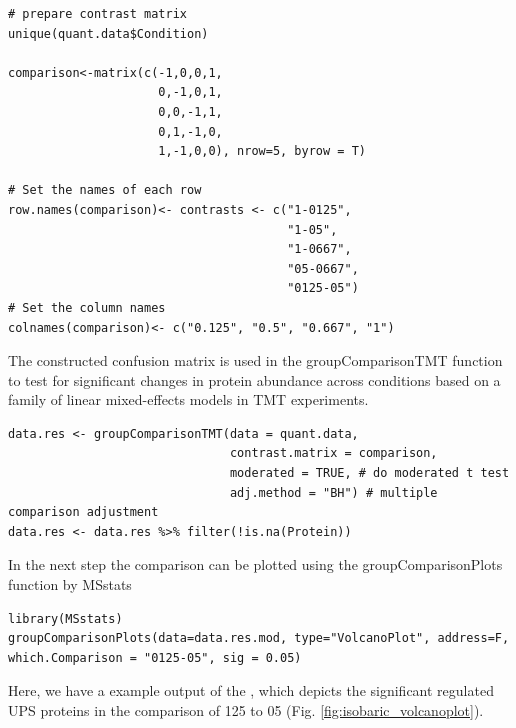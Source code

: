 \begin{lstlisting}
# prepare contrast matrix
unique(quant.data$Condition)

comparison<-matrix(c(-1,0,0,1,
                     0,-1,0,1,
                     0,0,-1,1,
                     0,1,-1,0,
                     1,-1,0,0), nrow=5, byrow = T)
                     
# Set the names of each row
row.names(comparison)<- contrasts <- c("1-0125",   
                                       "1-05",  
                                       "1-0667",
                                       "05-0667",
                                       "0125-05")
# Set the column names
colnames(comparison)<- c("0.125", "0.5", "0.667", "1")

\end{lstlisting}

\noindent The constructed confusion matrix is used in the groupComparisonTMT function to test for significant changes in protein abundance across conditions based on a family of linear mixed-effects models in TMT experiments. 

\begin{lstlisting}
data.res <- groupComparisonTMT(data = quant.data, 
                               contrast.matrix = comparison,
                               moderated = TRUE, # do moderated t test
                               adj.method = "BH") # multiple comparison adjustment
data.res <- data.res %>% filter(!is.na(Protein))
\end{lstlisting}

\noindent  In the next step the comparison can be plotted using the groupComparisonPlots function by MSstats

\begin{lstlisting}
library(MSstats)
groupComparisonPlots(data=data.res.mod, type="VolcanoPlot", address=F, which.Comparison = "0125-05", sig = 0.05)
\end{lstlisting}

\noindent  Here, we have a example output of the , which depicts the significant regulated  UPS proteins in the comparison of 125 to 05 (Fig. \ref{fig:isobaric_volcanoplot}). 


